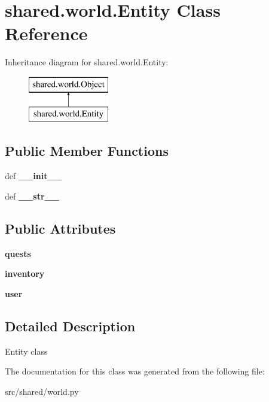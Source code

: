 \hypertarget{classshared_1_1world_1_1_entity}{\section{shared.\-world.\-Entity \-Class \-Reference}
\label{classshared_1_1world_1_1_entity}
}
\-Inheritance diagram for shared.\-world.\-Entity\-:\begin{figure}[H]
\begin{center}
\leavevmode
\includegraphics[height=2.000000cm]{classshared_1_1world_1_1_entity}
\end{center}
\end{figure}
\subsection*{\-Public \-Member \-Functions}
\begin{DoxyCompactItemize}
\item 
\hypertarget{classshared_1_1world_1_1_entity_a8d4435f8fd12545464f6f1951b38728c}{def {\bfseries \-\_\-\-\_\-init\-\_\-\-\_\-}}\label{classshared_1_1world_1_1_entity_a8d4435f8fd12545464f6f1951b38728c}

\item 
\hypertarget{classshared_1_1world_1_1_entity_adae0bf8b0786f428ddd5854be9af749c}{def {\bfseries \-\_\-\-\_\-str\-\_\-\-\_\-}}\label{classshared_1_1world_1_1_entity_adae0bf8b0786f428ddd5854be9af749c}

\end{DoxyCompactItemize}
\subsection*{\-Public \-Attributes}
\begin{DoxyCompactItemize}
\item 
\hypertarget{classshared_1_1world_1_1_entity_a6963ddc8568bef2bf0a087221bee599f}{{\bfseries quests}}\label{classshared_1_1world_1_1_entity_a6963ddc8568bef2bf0a087221bee599f}

\item 
\hypertarget{classshared_1_1world_1_1_entity_a247f906e940496d959aca9702960cafe}{{\bfseries inventory}}\label{classshared_1_1world_1_1_entity_a247f906e940496d959aca9702960cafe}

\item 
\hypertarget{classshared_1_1world_1_1_entity_a7a2a5e29869a497a3c4beb7e1e48545d}{{\bfseries user}}\label{classshared_1_1world_1_1_entity_a7a2a5e29869a497a3c4beb7e1e48545d}

\end{DoxyCompactItemize}


\subsection{\-Detailed \-Description}
\begin{DoxyVerb}Entity class \end{DoxyVerb}
 

\-The documentation for this class was generated from the following file\-:\begin{DoxyCompactItemize}
\item 
src/shared/world.\-py\end{DoxyCompactItemize}

